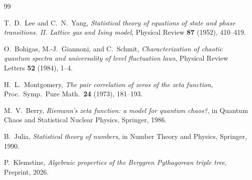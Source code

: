 \documentclass[12pt]{amsart}
\theoremstyle{definition}
\theoremstyle{remark}
\begin{document}
\begin{thebibliography}{99}

T.~D.~Lee and C.~N.~Yang,
\emph{Statistical theory of equations of state and phase transitions. II.
Lattice gas and Ising model},
Physical Review \textbf{87} (1952), 410--419.

O.~Bohigas, M.-J.~Giannoni, and C.~Schmit,
\emph{Characterization of chaotic quantum spectra and universality of level
fluctuation laws},
Physical Review Letters \textbf{52} (1984), 1--4.

H.~L.~Montgomery,
\emph{The pair correlation of zeros of the zeta function},
Proc.\ Symp.\ Pure Math.\ \textbf{24} (1973), 181--193.

M.~V.~Berry,
\emph{Riemann's zeta function: a model for quantum chaos?},
in Quantum Chaos and Statistical Nuclear Physics, Springer, 1986.

B.~Julia,
\emph{Statistical theory of numbers},
in Number Theory and Physics, Springer, 1990.

P.~Klemstine,
\emph{Algebraic properties of the Berggren Pythagorean triple tree},
Preprint, 2026.

\end{thebibliography}
\end{document}
